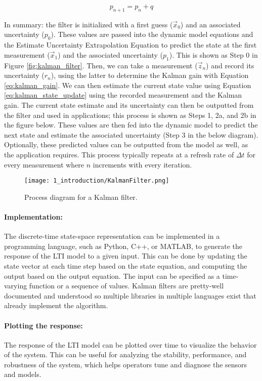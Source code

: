 
\begin{equation}
    p_{n+1} = p_n + q
\end{equation}

In summary: the filter is initialized with a first guess ($\vec{x}_{0}$) and an associated uncertainty ($p_{0}$). 
These values are passed into the dynamic model equations and the Estimate Uncertainty Extrapolation Equation to predict the state at the first measurement ($\vec{x}_{1}$) and the associated uncertainty ($p_{1}$).
This is shown as Step 0 in Figure \ref{fig:kalman_filter}.
Then, we can take a measurement ($\vec{z}_n$) and record its uncertainty ($r_n$), using the latter to determine the Kalman gain with Equation \ref{eq:kalman_gain}.
We can then estimate the current state value using Equation \ref{eq:kalman_state_update} using the recorded measurement and the Kalman gain.
The current state estimate and its uncertainty can then be outputted from the filter and used in applications; this process is shown as Steps 1, 2a, and 2b in the figure below.
These values are then fed into the dynamic model to predict the next state and estimate the associated uncertainty (Step 3 in the below diagram).
Optionally, these predicted values can be outputted from the model as well, as the application requires.
This process typically repeats at a refresh rate of $\Delta t$ for every measurement where $n$ increments with every iteration.

\begin{figure*}[h!]
    \texttt{[image: 1\_introduction/KalmanFilter.png]}
    \caption[Kalman Filter Diagram]{Process diagram for a Kalman filter.}
\end{figure*}

\paragraph{Implementation:} The discrete-time state-space representation can be implemented in a programming language, such as Python, C++, or MATLAB, to generate the response of the LTI model to a given input. 
This can be done by updating the state vector at each time step based on the state equation, and computing the output based on the output equation. The input can be specified as a time-varying function or a sequence of values.
Kalman filters are pretty-well documented and understood so multiple libraries in multiple languages exist that already implement the algorithm.

\paragraph*{Plotting the response:} The response of the LTI model can be plotted over time to visualize the behavior of the system. 
This can be useful for analyzing the stability, performance, and robustness of the system, which helps operators tune and diagnose the sensors and models.
